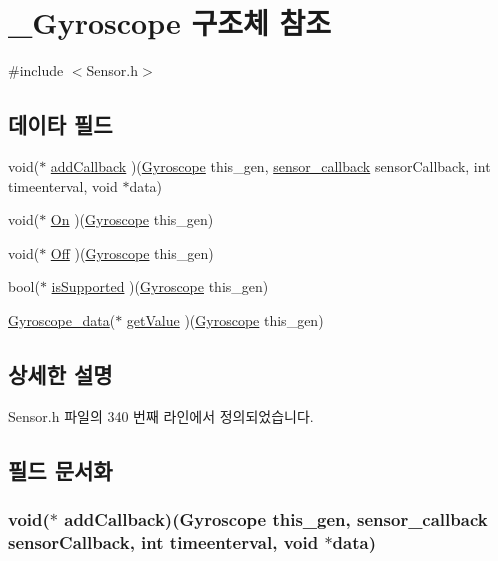 \hypertarget{struct___gyroscope}{\section{\-\_\-\-Gyroscope 구조체 참조}
\label{struct___gyroscope}
}


{\ttfamily \#include $<$Sensor.\-h$>$}

\subsection*{데이타 필드}
\begin{DoxyCompactItemize}
\item 
void($\ast$ \hyperlink{struct___gyroscope_a9ee901b5cbca422e01009632df55dbc0}{add\-Callback} )(\hyperlink{_sensor_8h_a24afd023a4f5a5d89435215fc22449b9}{Gyroscope} this\-\_\-gen, \hyperlink{_sensor_8h_ad8114207845fc5e0aa30832f0c718cd6}{sensor\-\_\-callback} sensor\-Callback, int timeenterval, void $\ast$data)
\item 
void($\ast$ \hyperlink{struct___gyroscope_a001e94a565eb41447701e3519d2d7a75}{On} )(\hyperlink{_sensor_8h_a24afd023a4f5a5d89435215fc22449b9}{Gyroscope} this\-\_\-gen)
\item 
void($\ast$ \hyperlink{struct___gyroscope_a16950c07b1deb4c02cd4909b4c78b21e}{Off} )(\hyperlink{_sensor_8h_a24afd023a4f5a5d89435215fc22449b9}{Gyroscope} this\-\_\-gen)
\item 
bool($\ast$ \hyperlink{struct___gyroscope_ac0f373cd10a93722406c823688676dee}{is\-Supported} )(\hyperlink{_sensor_8h_a24afd023a4f5a5d89435215fc22449b9}{Gyroscope} this\-\_\-gen)
\item 
\hyperlink{_sensor_8h_a10859114954f1b73537e418caa4cd698}{Gyroscope\-\_\-data}($\ast$ \hyperlink{struct___gyroscope_a9e5519a135ce1a2b58d7e21fd2d53171}{get\-Value} )(\hyperlink{_sensor_8h_a24afd023a4f5a5d89435215fc22449b9}{Gyroscope} this\-\_\-gen)
\end{DoxyCompactItemize}


\subsection{상세한 설명}


Sensor.\-h 파일의 340 번째 라인에서 정의되었습니다.



\subsection{필드 문서화}
\hypertarget{struct___gyroscope_a9ee901b5cbca422e01009632df55dbc0}{
\subsubsection[{add\-Callback}]{\setlength{\rightskip}{0pt plus 5cm}void($\ast$  add\-Callback)({\bf Gyroscope} this\-\_\-gen, {\bf sensor\-\_\-callback} sensor\-Callback, int timeenterval, void $\ast$data)}}\label{struct___gyroscope_a9ee901b5cbca422e01009632df55dbc0}


